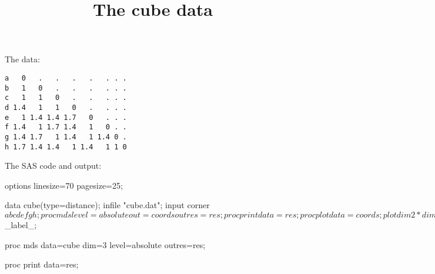 \documentclass{article}
\title{The cube data}
\begin{document}
\maketitle
The data:
\begin{verbatim}
a   0   .   .   .   .   . . .
b   1   0   .   .   .   . . .
c   1   1   0   .   .   . . .
d 1.4   1   1   0   .   . . .
e   1 1.4 1.4 1.7   0   . . .
f 1.4   1 1.7 1.4   1   0 . .
g 1.4 1.7   1 1.4   1 1.4 0 .
h 1.7 1.4 1.4   1 1.4   1 1 0

\end{verbatim}
The SAS code and output:
\begin{Winput}
options linesize=70 pagesize=25;

data cube(type=distance);
  infile "cube.dat";
  input corner $ a b c d e f g h;

proc mds level=absolute out=coords outres=res;

proc print data=res;

proc plot data=coords;
  plot dim2*dim1 $ _label_;

proc mds data=cube dim=3 level=absolute outres=res;

proc print data=res;


\end{Winput}
\end{document}
